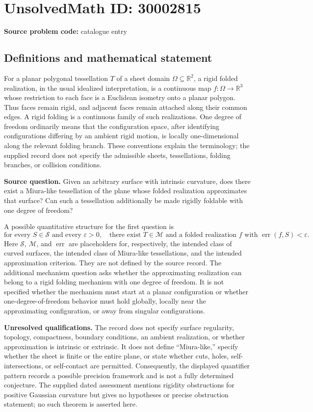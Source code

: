 \documentclass[11pt]{article}
\newcommand{\R}{\mathbb{R}}
\begin{document}
\section*{UnsolvedMath ID: 30002815}
\textbf{Source problem code:} catalogue entry
\subsection{Definitions and mathematical statement}
For a planar polygonal tessellation \(T\) of a sheet domain \(\Omega\subseteq\R^2\), a rigid folded realization, in the usual idealized interpretation, is a continuous map \(f:\Omega\to\R^3\) whose restriction to each face is a Euclidean isometry onto a planar polygon. Thus faces remain rigid, and adjacent faces remain attached along their common edges. A rigid folding is a continuous family of such realizations. One degree of freedom ordinarily means that the configuration space, after identifying configurations differing by an ambient rigid motion, is locally one-dimensional along the relevant folding branch. These conventions explain the terminology; the supplied record does not specify the admissible sheets, tessellations, folding branches, or collision conditions.

\textbf{Source question.} Given an arbitrary surface with intrinsic curvature, does there exist a Miura-like tessellation of the plane whose folded realization approximates that surface? Can such a tessellation additionally be made rigidly foldable with one degree of freedom?

A possible quantitative structure for the first question is
\[
\text{for every }S\in\mathcal S\text{ and every }\varepsilon>0,\quad
\text{there exist }T\in\mathcal M\text{ and a folded realization }f
\text{ with }\operatorname{err}(f,S)<\varepsilon.
\]
Here \(\mathcal S\), \(\mathcal M\), and \(\operatorname{err}\) are placeholders for, respectively, the intended class of curved surfaces, the intended class of Miura-like tessellations, and the intended approximation criterion. They are not defined by the source record. The additional mechanism question asks whether the approximating realization can belong to a rigid folding mechanism with one degree of freedom. It is not specified whether the mechanism must start at a planar configuration or whether one-degree-of-freedom behavior must hold globally, locally near the approximating configuration, or away from singular configurations.

\textbf{Unresolved qualifications.} The record does not specify surface regularity, topology, compactness, boundary conditions, an ambient realization, or whether approximation is intrinsic or extrinsic. It does not define ``Miura-like,'' specify whether the sheet is finite or the entire plane, or state whether cuts, holes, self-intersections, or self-contact are permitted. Consequently, the displayed quantifier pattern records a possible precision framework and is not a fully determined conjecture. The supplied dated assessment mentions rigidity obstructions for positive Gaussian curvature but gives no hypotheses or precise obstruction statement; no such theorem is asserted here.
\end{document}

